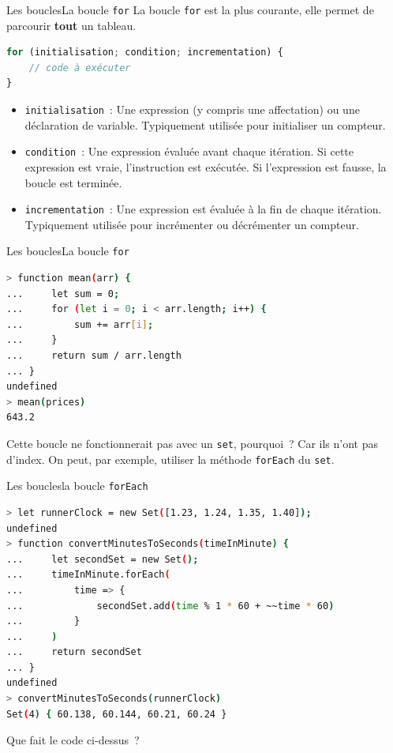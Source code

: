 \documentclass{beamer}
\begin{document}
    \begin{frame}[fragile]{Les boucles}{La boucle \lstinline{for}}
        La boucle \lstinline{for} est la plus courante, elle permet de parcourir \textbf{tout} un tableau.
        \begin{lstlisting}[language=JavaScript,title={\tiny{Script JavaScript}}]
for (initialisation; condition; incrementation) {
    // code à exécuter
}
        \end{lstlisting}
        \begin{itemize}
            \item \lstinline{initialisation}~: Une expression (y compris une affectation) ou une déclaration de variable.
            Typiquement utilisée pour initialiser un compteur.
            \item \lstinline{condition}~: Une expression évaluée avant chaque itération.
            Si cette expression est vraie, l'instruction est exécutée.
            Si l'expression est fausse, la boucle est terminée.
            \item \lstinline{incrementation}~: Une expression est évaluée à la fin de chaque itération.
            Typiquement utilisée pour incrémenter ou décrémenter un compteur.
        \end{itemize}
    \end{frame}

    \begin{frame}[fragile]{Les boucles}{La boucle \lstinline{for}}
        \begin{lstlisting}[language=Bash,title={\tiny{Node.js}}]
> function mean(arr) {
...     let sum = 0;
...     for (let i = 0; i < arr.length; i++) {
...         sum += arr[i];
...     }
...     return sum / arr.length
... }
undefined
> mean(prices)
643.2
        \end{lstlisting}
        \bigbreak
        Cette boucle ne fonctionnerait pas avec un \lstinline{set}, pourquoi~?
        \pause
        \bigbreak
        Car ils n'ont pas d'index.
        On peut, par exemple, utiliser la méthode \lstinline{forEach} du \lstinline{set}.
    \end{frame}

    \begin{frame}[fragile]{Les boucles}{la boucle \lstinline{forEach}}
        \begin{lstlisting}[language=Bash,title={\tiny{Node.js}}]
> let runnerClock = new Set([1.23, 1.24, 1.35, 1.40]);
undefined
> function convertMinutesToSeconds(timeInMinute) {
...     let secondSet = new Set();
...     timeInMinute.forEach(
...         time => {
...             secondSet.add(time % 1 * 60 + ~~time * 60)
...         }
...     )
...     return secondSet
... }
undefined
> convertMinutesToSeconds(runnerClock)
Set(4) { 60.138, 60.144, 60.21, 60.24 }
        \end{lstlisting}
        \bigbreak
        Que fait le code ci-dessus~?
    \end{frame}
\end{document}
